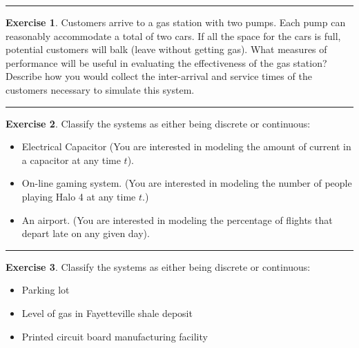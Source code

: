 \documentclass[
]{book}
\theoremstyle{definition}
\theoremstyle{definition}
\theoremstyle{definition}
\newtheorem{exercise}{Exercise}[chapter]
\theoremstyle{definition}
\theoremstyle{remark}
\begin{document}
\begin{center}\rule{0.5\linewidth}{0.5pt}\end{center}

\begin{exercise}
\protect\hypertarget{exr:ch1P2}{}{\label{exr:ch1P2} }Customers arrive to a gas
station with two pumps. Each pump can reasonably accommodate a total of
two cars. If all the space for the cars is full, potential customers
will balk (leave without getting gas). What measures of performance will
be useful in evaluating the effectiveness of the gas station? Describe
how you would collect the inter-arrival and service times of the
customers necessary to simulate this system.
\end{exercise}

\begin{center}\rule{0.5\linewidth}{0.5pt}\end{center}

\begin{exercise}
\protect\hypertarget{exr:ch1P3}{}{\label{exr:ch1P3} }Classify the systems as either being discrete or continuous:

\begin{itemize}
\item
  Electrical Capacitor (You are interested in modeling the amount of
  current in a capacitor at any time \(t\)).
\item
  On-line gaming system. (You are interested in modeling the number of
  people playing Halo 4 at any time \(t\).)
\item
  An airport. (You are interested in modeling the percentage of flights
  that depart late on any given day).
\end{itemize}
\end{exercise}

\begin{center}\rule{0.5\linewidth}{0.5pt}\end{center}

\begin{exercise}
\protect\hypertarget{exr:ch1P4}{}{\label{exr:ch1P4} }Classify the systems as either being discrete or continuous:

\begin{itemize}
\item
  Parking lot
\item
  Level of gas in Fayetteville shale deposit
\item
  Printed circuit board manufacturing facility
\end{itemize}
\end{exercise}
\end{document}
